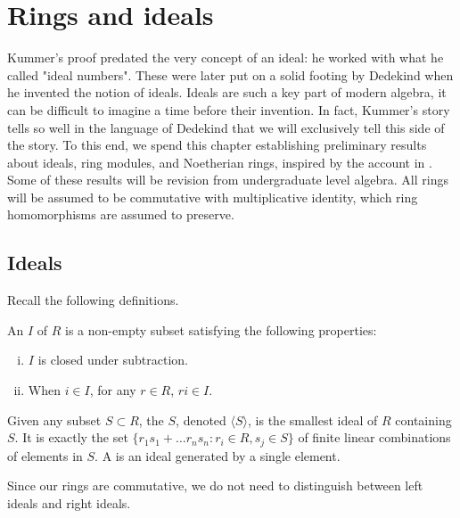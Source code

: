 \chapter{Rings and ideals}\label{sec-rings}
Kummer's proof predated the very concept of an ideal: he worked with what he called "ideal numbers". These were later put on a solid footing by Dedekind when he invented the notion of ideals. Ideals are such a key part of modern algebra, it can be difficult to imagine a time before their invention. In fact, Kummer's story tells so well in the language of Dedekind that we will exclusively tell this side of the story. To this end, we spend this chapter establishing preliminary results about ideals, ring modules, and Noetherian rings, inspired by the account in \cite{Wright}. Some of these results will be revision from undergraduate level algebra. All rings will be assumed to be commutative with multiplicative identity, which ring homomorphisms are assumed to preserve.
\section{Ideals}
Recall the following definitions.
\begin{definition}
An  $I$ of $R$ is a non-empty subset satisfying the following properties:
\begin{enumerate}[(i)]
    \item $I$ is closed under subtraction.
    \item When $i\in I$, for any $r\in R$, $ri\in I$.
\end{enumerate}
\end{definition}
\begin{definition}
Given any subset $S\subset R$, the  $S$, denoted $\langle S\rangle$, is the smallest ideal of $R$ containing $S$. It is exactly the set $\{r_1s_1+\dots r_ns_n: r_i\in R, s_j\in S\}$ of finite linear combinations of elements in $S$. A  is an ideal generated by a single element.
\end{definition}

\begin{remark}
Since our rings are commutative, we do not need to distinguish between left ideals and right ideals.
\end{remark}

